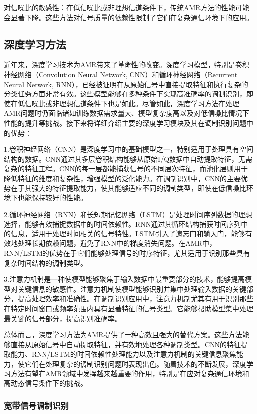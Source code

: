 对信噪比的敏感性：在低信噪比或非理想信道条件下，传统AMR方法的性能可能会显著下降。这些方法对信号质量的依赖性限制了它们在复杂通信环境下的应用。

\subsection{深度学习方法}\label{sec:background}
近年来，深度学习技术为AMR带来了革命性的改变。深度学习模型，特别是卷积神经网络（Convolution Neural Network, CNN）和循环神经网络（Recurrent Neural Network, RNN），已经被证明在从原始信号中直接提取特征和执行复杂的分类任务方面非常有效。这些模型能够在多种条件下实现高准确率的调制识别，即使在低信噪比或非理想信道条件下也是如此。尽管如此，深度学习方法在处理AMR问题时仍面临诸如训练数据需求量大、模型复杂度高以及对低信噪比情况下性能的提升等挑战。接下来将详细介绍主要的深度学习模块及其在调制识别问题中的优势：

1.卷积神经网络（CNN）是深度学习中的基础模型之一，特别适用于处理具有空间结构的数据。CNN通过其多层卷积结构能够从原始I/Q数据中自动提取特征，无需复杂的特征工程。CNN的每一层都能捕获信号的不同层次特征，而池化层则用于降低特征的维度和复杂性，增强模型的泛化能力。在调制识别中，CNN的主要优势在于其强大的特征提取能力，使其能够适应不同的调制类型，即使在低信噪比环境下也能保持较好的性能。

2.循环神经网络（RNN）和长短期记忆网络（LSTM）是处理时间序列数据的理想选择，能够有效捕捉数据中的时间依赖性。RNN通过其循环结构捕获时间序列中的信息，适用于处理时间相关的信号特性。LSTM引入了遗忘门和输入门，能够有效地处理长期依赖问题，避免了RNN中的梯度消失问题。在AMR中，RNN/LSTM的优势在于它们能够处理信号的时序特征，尤其适用于识别那些具有复杂时间结构的调制类型。

3.注意力机制是一种使模型能够聚焦于输入数据中最重要部分的技术，能够提高模型对关键信息的敏感性。注意力机制使模型能够识别并集中处理输入数据的关键部分，提高处理效率和准确性。在调制识别应用中，注意力机制尤其有用于识别那些在特定时间窗口或频率范围内具有显著特征的信号类型。它能够帮助模型集中处理最关键的信号部分，提高识别准确率。

总体而言，深度学习方法为AMR提供了一种高效且强大的替代方案。这些方法能够直接从原始信号中自动提取特征，并有效地处理各种调制类型。CNN的特征提取能力、RNN/LSTM的时间依赖性处理能力以及注意力机制的关键信息聚焦能力，使它们在处理复杂的调制识别问题时表现出色。随着技术的不断发展，深度学习方法有望在AMR领域中发挥越来越重要的作用，特别是在应对复杂通信环境和高动态信号条件下的挑战。

\subsubsection{宽带信号调制识别}\label{sec:background}

